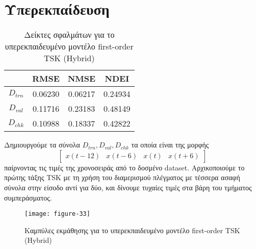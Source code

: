\documentclass[11pt,a4paper,titlepage, oneside]{article}
\newlength\figureheight
\newlength\figurewidth
\begin{document}
	\section{Υπερεκπαίδευση}
			\begin{wraptable}{r}{0.5\textwidth}
				\centering
				\begin{tabular}{c | c c c}
					 & \bfseries{RMSE} & \bfseries{NMSE} & \bfseries{NDEI} \\ \hline{}
					 $D_{trn}$ & 0.06230 & 0.06217 & 0.24934 \\ \hline
					 $D_{val}$ & 0.11716 & 0.23183 & 0.48149 \\ \hline
					 $D_{chk}$ & 0.10988 & 0.18337 & 0.42822 \\
				\end{tabular}
				\caption{Δείκτες σφαλμάτων για το υπερεκπαιδευμένο μοντέλο first-order TSK (Hybrid)}
				\label{tab:overfit_error_metrics}
				\vspace{10pt}
			\end{wraptable}
			Δημιουργούμε τα σύνολα $D_{trn}, D_{val}, D_{chk}$ τα οποία είναι της μορφής 
			$$ \begin{bmatrix} x(t-12) & x(t-6) & x(t) & x(t+6) \end{bmatrix} $$
			παίρνοντας τις τιμές της χρονοσειράς από το δοσμένο dataset. Αρχικοποιούμε το πρώτης τάξης TSK με τη χρήση του διαμερισμού πλέγματος με τέσσερα ασαφή σύνολα στην είσοδο αντί για δύο, και δίνουμε τυχαίες τιμές στα βάρη του τμήματος συμπεράσματος.\\
						
			\begin{wrapfigure}{r}{0.5\textwidth}
				\vspace{-15pt}
			 	\setlength{}
				\setlength{}	
				\centering
				\texttt{[image: figure-33]}
				\caption{Καμπύλες εκμάθησης για το υπερεκπαιδευμένο μοντέλο first-order TSK (Hybrid)}
				\label{fig:overfit_learning_curves}
			\end{wrapfigure}
			
\end{document}
